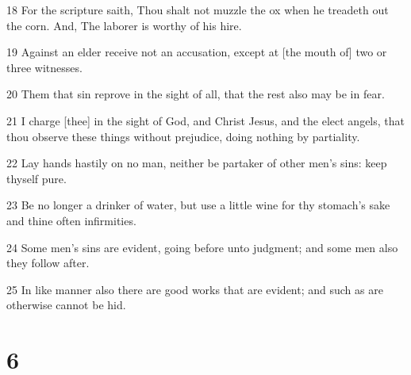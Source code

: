 \par 18 For the scripture saith, Thou shalt not muzzle the ox when he treadeth out the corn. And, The laborer is worthy of his hire.
\par 19 Against an elder receive not an accusation, except at [the mouth of] two or three witnesses.
\par 20 Them that sin reprove in the sight of all, that the rest also may be in fear.
\par 21 I charge [thee] in the sight of God, and Christ Jesus, and the elect angels, that thou observe these things without prejudice, doing nothing by partiality.
\par 22 Lay hands hastily on no man, neither be partaker of other men's sins: keep thyself pure.
\par 23 Be no longer a drinker of water, but use a little wine for thy stomach's sake and thine often infirmities.
\par 24 Some men's sins are evident, going before unto judgment; and some men also they follow after.
\par 25 In like manner also there are good works that are evident; and such as are otherwise cannot be hid.

\chapter{6}

